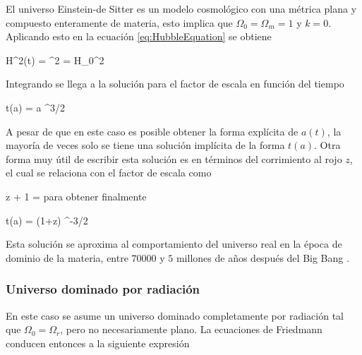 El universo Einstein-de Sitter es un modelo cosmológico con una métrica 
plana y compuesto enteramente de materia, esto implica que 
$\Omega_0 = \Omega_m = 1$ y $k=0$. Aplicando esto en la ecuación 
\ref{eq:HubbleEquation} se obtiene


{ H^2(t) = ^2 = H_0^2  }


Integrando se llega a la solución para el factor de escala en función del 
tiempo


{ t(a) =  a ^{3/2} }


A pesar de que en este caso es posible obtener la forma explícita de $a(t)$,
la mayoría de veces solo se tiene una solución implícita de la forma $t(a)$.
Otra forma muy útil de escribir esta solución es en términos del corrimiento
al rojo $z$, el cual se relaciona con el factor de escala como 
\cite{longair2008}


{ z + 1 =  }
para obtener finalmente


{ t(a) =  (1+z) ^{-3/2} }


Esta solución se aproxima al comportamiento del universo real en la época
de dominio de la materia, entre $70000$ y $5$ millones de años después del 
Big Bang \cite{padmanabhan1995}.


			\subsubsection*{Universo dominado por radiación}

En este caso se asume un universo dominado completamente por radiación tal
que $\Omega_0 = \Omega_r$, pero no necesariamente plano. La ecuaciones de 
Friedmann conducen entonces a la siguiente expresión


